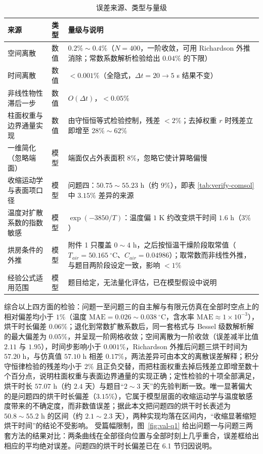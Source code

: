 \documentclass[12pt,a4paper]{article}
\begin{document}
\begin{center}
\begin{table}[H]
\centering
\caption{误差来源、类型与量级}
\label{tab:error-source}
\small
\begin{tabular}{p{3.4cm}p{1.6cm}p{9.6cm}}
\toprule
来源 & 类型 & 量级与说明\\
\midrule
空间离散 & 数值 & $0.2\%\sim0.4\%$（$N=400$，一阶收敛，可用 Richardson 外推消除；常数系数解析检验给出 $0.04\%$ 的下限）\\
时间离散 & 数值 & $<0.001\%$（全隐式，$\Delta t=20\to5$ s 结果不变）\\
非线性物性滞后一步 & 数值 & $O(\Delta t)$，$<0.05\%$\\
柱面权重与边界通量实现 & 数值 & 由守恒恒等式检验控制，残差 $<2\%$；去掉权重 $r$ 时残差立即增至 $28\%\sim62\%$\\
一维简化（忽略端面） & 模型 & 端面仅占外表面积 $8\%$，忽略它使计算略偏慢\\
收缩运动学与表面项口径 & 模型 & 问题四：$50.75\sim55.23$ h（约 $9\%$），即表 \ref{tab:verify-comsol} 中 $3.15\%$ 差异的来源\\
温度对扩散系数的指数敏感 & 模型 & $\exp(-3850/T)$：温度偏 $1$ K 约改变烘干时间 $1.6$ h（$3\%$）\\
烘房条件的外推 & 模型 & 附件 1 只覆盖 $0\sim4$ h，之后按恒温干燥阶段取常值（$T_{air}=50.165\ \mathrm{^\circ C}$、$C_{air}=0.04986$）；取常数而非线性外推，与题目两阶段设定一致，影响 $<1\%$\\
经验公式适用范围 & 模型 & 题目给定，无法量化评估，已在模型假设中说明\\
\bottomrule
\end{tabular}
\end{table}

综合以上四方面的检验：问题一至问题三的自主解与有限元仿真在全部时空点上的相对偏差均小于 $1\%$（温度 $\mathrm{MAE}=0.026\sim0.038\ \mathrm{^\circ C}$，含水率 $\mathrm{MAE}\approx1\times10^{-3}$），烘干时长偏差 $0.06\%$；退化到常数扩散系数后，同一套格式与 Bessel 级数解析解的最大偏差为 $0.05\%$，并呈现一阶网格收敛；空间离散为一阶收敛（误差减半比值 $2.11$ 与 $1.95$），时间步影响小于 $0.001\%$，Richardson 外推后问题三烘干时间为 $57.20$ h，与仿真值 $57.10$ h 相差 $0.17\%$，两法差异可由本文的离散误差解释；积分守恒律检验的残差均小于 $2\%$ 且正负交替，而把柱面权重去掉后残差立即增至数十个百分点，说明柱面权重与表面边界通量的实现正确；定性检验的十项全部满足，烘干时长 $57.07$ h（约 $2.4$ 天）与题目“$2\sim3$ 天”的先验判断一致。唯一显著偏大的是问题四的烘干时长偏差（$3.15\%$），它属于模型层面的收缩运动学与温度敏感度带来的不确定度，而非数值误差；据此本文把问题四的烘干时长表述为 $50.8\sim55.2$ h 的区间（约 $2.1\sim2.3$ 天），两种实现均落在区间内，“收缩显著缩短烘干时间”的结论不受影响。
受篇幅限制，图~\ref{fig:val-q1} 给出问题一与问题三两套方法的结果对比：两条曲线在全部径向位置与全部时刻上几乎重合，误差框给出相应的平均绝对误差。问题四的烘干时长偏差已在 6.1 节归因说明。


\end{center}
\end{document}

